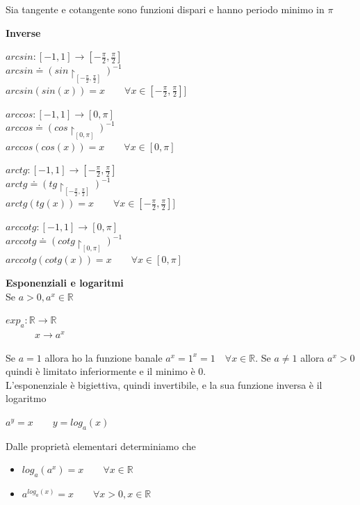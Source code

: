 \documentclass[12pt, a4paper]{article}
\begin{document}
Sia tangente e cotangente sono funzioni dispari e hanno periodo minimo in $\pi$

\textbf{Inverse}
\begin{center}
    $arcsin:[-1,1]\rightarrow[-\frac{\pi}{2},\frac{\pi}{2}]$\\
    $arcsin\doteq(sin\upharpoonright_{[-\frac{\pi}{2},\frac{\pi}{2}]})^{-1}$\\
    $arcsin(sin(x))=x \qquad \forall x\in[-\frac{\pi}{2},\frac{\pi}{2}]]$
\end{center}

\begin{center}
    $arccos:[-1,1]\rightarrow[0,\pi]$\\
    $arccos\doteq(cos\upharpoonright_{[0,\pi]})^{-1}$\\
    $arccos(cos(x))=x \qquad \forall x\in[0,\pi]$
\end{center}

\begin{center}
    $arctg:[-1,1]\rightarrow[-\frac{\pi}{2},\frac{\pi}{2}]$\\
    $arctg\doteq(tg\upharpoonright_{[-\frac{\pi}{2},\frac{\pi}{2}]})^{-1}$\\
    $arctg(tg(x))=x \qquad \forall x\in[-\frac{\pi}{2},\frac{\pi}{2}]]$
\end{center}

\begin{center}
    $arccotg:[-1,1]\rightarrow[0,\pi]$\\
    $arccotg\doteq(cotg\upharpoonright_{[0,\pi]})^{-1}$\\
    $arccotg(cotg(x))=x \qquad \forall x\in[0,\pi]$
\end{center}

\textbf{Esponenziali e logaritmi}\\Se $a>0, a^{x}\in\mathbb{R}$
\begin{center}
    $exp_{a}:\mathbb{R}\rightarrow\mathbb{R}$\\
    $\qquad\quad x\rightarrow a^{x}$
\end{center}
Se $a=1$ allora ho la funzione banale $a^{x}=1^{x}=1\quad \forall x\in\mathbb{R}$. Se $a\neq1$ allora $a^{x}>0$
quindi è limitato inferiormente e il minimo è 0.\\
L'esponenziale è bigiettiva, quindi invertibile, e la sua funzione inversa è il logaritmo
\begin{center}
    $a^{y}=x\qquad y=log_{a}(x)$
\end{center}
Dalle proprietà elementari determiniamo che
\begin{itemize}
    \item $log_{a}(a^{x})=x\qquad \forall x\in\mathbb{R}$
    \item $a^{log_{a}(x)}=x\qquad \forall x>0, x\in\mathbb{R}$
\end{itemize}
\end{document}
